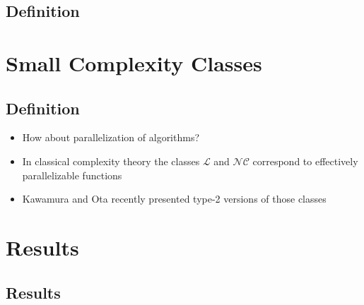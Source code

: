 \documentclass[xcolor=pdftex,dvipsnames,table,handout]{beamer}
\newcommand{\cl}{\ensuremath{\mathcal{L}}\xspace}
\newcommand{\nc}{\ensuremath{\mathcal{NC}}\xspace}
\begin{document}
\subsection{Definition}
\section{Small Complexity Classes}
\subsection{Definition}
\begin{frame}
  \begin{itemize}
  \item How about parallelization of algorithms?
  \item In classical complexity theory the classes \cl and \nc correspond to effectively parallelizable functions
  \item Kawamura and Ota recently presented type-2 versions of those classes
  \end{itemize}
\end{frame}
\section{Results}
\subsection{Results}
\end{document}
